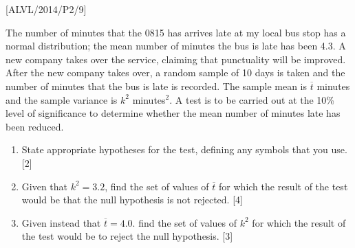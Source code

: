 \item {[}ALVL/2014/P2/9{]}

The number of minutes that the 0815 has arrives late at my local bus
stop has a normal distribution; the mean number of minutes the bus
is late has been 4.3. A new company takes over the service, claiming
that punctuality will be improved. After the new company takes over,
a random sample of 10 days is taken and the number of minutes that
the bus is late is recorded. The sample mean is $\overline{t}$ minutes
and the sample variance is $k^{2}$ minutes$^{2}$. A test is to be
carried out at the 10\% level of significance to determine whether
the mean number of minutes late has been reduced. 
\begin{enumerate}
\item State appropriate hypotheses for the test, defining any symbols that
you use.\hfill{} {[}2{]}
\item Given that $k^{2}=3.2$, find the set of values of $\overline{t}$
for which the result of the test would be that the null hypothesis
is not rejected.\hfill{} {[}4{]}
\item Given instead that $\overline{t}=4.0$. find the set of values of
$k^{2}$ for which the result of the test would be to reject the null
hypothesis.\hfill{} {[}3{]}
\end{enumerate}
